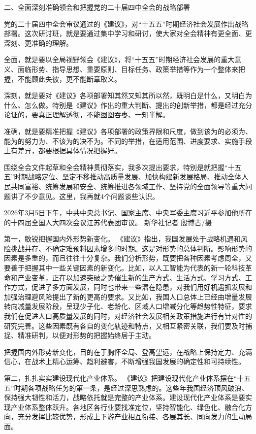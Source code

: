 \documentclass[UTF8,zihao=-4]{ctexart}
\begin{document}
二、全面深刻准确领会和把握党的二十届四中全会的战略部署

党的二十届四中全会审议通过的《建议》，对“十五五”时期经济社会发展作出战略部署。这次研讨班，就是要通过集中学习和研讨，使大家对全会精神有更全面、更深刻、更准确的理解。

全面，就是要以全局视野领会《建议》，将“十五五”时期经济社会发展的重大意义、面临形势、指导思想、重要原则、目标任务、政策举措等作为一个整体来把握，不能顾此失彼，更不能断章取义。

深刻，就是要对《建议》各项部署知其然又知其所以然，既明白是什么，又明白为什么、怎么做。特别是《建议》作出的重大判断、提出的创新举措，都是经过充分论证的，要真正理解透彻，不能囫囵吞枣、一知半解。

准确，就是要精准把握《建议》各项部署的政策界限和尺度，做到该为的必须为、能为的努力为、不该为的决不为。不同的举措，在适用范围、进度要求、实施手段上有差异，都要根据具体情况把握好。

围绕全会文件起草和全会精神贯彻落实，我多次提出要求，特别是就把握“十五五”时期战略定位、坚定不移推动高质量发展、加快构建新发展格局、推动全体人民共同富裕、统筹发展和安全、统筹推进各领域工作、坚持党的全面领导等重大问题讲了不少意见。这里，我再就4个问题谈些认识。

2026年3月5日下午，中共中央总书记、国家主席、中央军委主席习近平参加他所在的十四届全国人大四次会议江苏代表团审议。 新华社记者 殷博古/摄

第一，敏锐把握国内外形势新变化。 《建议》指出，我国发展处于战略机遇和风险挑战并存、不确定难预料因素增多的时期。这是对形势的总体判断。影响形势的因素是多重的，而且往往十分复杂。我们分析形势，既要把各种因素考虑周全，又要善于把握其中一些关键因素的新变化。比如，以人工智能为代表的新一轮科技革命和产业变革，正在以加速突破之势催生新的生产方式、生活方式、学习方式、工作方式，促进了多方面发展，同时也带来一些潜在隐患，对我们用好机遇抓发展和加强治理避风险提出了新的更高的要求。又比如，我国人口总体上已经由增量发展转向减量发展阶段，呈现少子化、老龄化、区域人口增减分化等趋势性特征，要求我们在促进人口高质量发展的同时，对经济社会发展相关政策措施进行有针对性的研究完善。这些因素既有各自的变化轨迹和特点，又相互紧密关联，我们要及时捕捉、精准研判，以便对形势的把握始终居于主动。

把握国内外形势新变化，目的在于胸怀全局、登高望远，在战略上保持定力、充满信心，在战术上精心运筹、趋利避害，不断增强我国发展的确定性和可持续性。

第二，扎扎实实建设现代化产业体系。 《建议》把建设现代化产业体系摆在“十五五”时期各项战略任务的第一条，是经过深思熟虑的。这些年我国经济顶风破浪、保持强大韧性和活力，战略依托就是完整的产业体系。建设现代化产业体系是要实现产业体系整体跃升。各地区各行业要找准定位，坚持智能化、绿色化、融合化方向，充分发挥比较优势，形成上下游产业相互衔接、各展其长、同向发力的生动局面。
\end{document}

